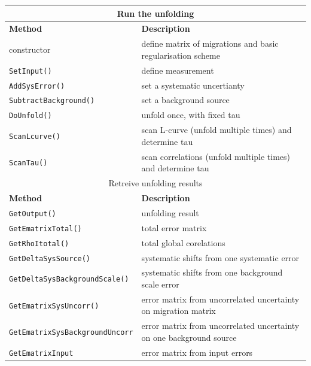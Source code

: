 \documentclass[12pt]{article}
\begin{document}
\begin{table}[ht]
\centering
\begin{tabular}{l|p{}}
\hline
\multicolumn{2}{c}{Run the unfolding} \\
\hline
{\bf Method} & {\bf Description} \\
\hline
constructor & define matrix of migrations and basic regularisation scheme
 \\
{\tt SetInput()} & define measurement
 \\
{\tt AddSysError()} & set a systematic uncertianty
 \\
{\tt SubtractBackground()} & set a background source
 \\
{\tt DoUnfold()} & unfold once, with fixed tau
 \\
{\tt ScanLcurve()} & scan L-curve (unfold multiple times) and determine tau
 \\
{\tt ScanTau()} & scan correlations (unfold multiple times) and determine tau
 \\
\hline
\hline
\multicolumn{2}{c}{Retreive unfolding results}
 \\
\hline
{\bf Method} & {\bf Description}
 \\
\hline
{\tt GetOutput()} & unfolding result
 \\
{\tt GetEmatrixTotal()} & total error matrix
 \\
{\tt GetRhoItotal()} & total global corelations
 \\
{\tt GetDeltaSysSource()} & systematic shifts from one systematic error
 \\
{\tt GetDeltaSysBackgroundScale()} & systematic shifts from one background
scale error
 \\
{\tt GetEmatrixSysUncorr()} & error matrix from 
uncorrelated uncertainty on migration matrix
 \\
{\tt GetEmatrixSysBackgroundUncorr} & error matrix from 
uncorrelated uncertainty on one background source
 \\
{\tt GetEmatrixInput} & error matrix from input errors

\end{tabular}
\end{table}
\end{document}
